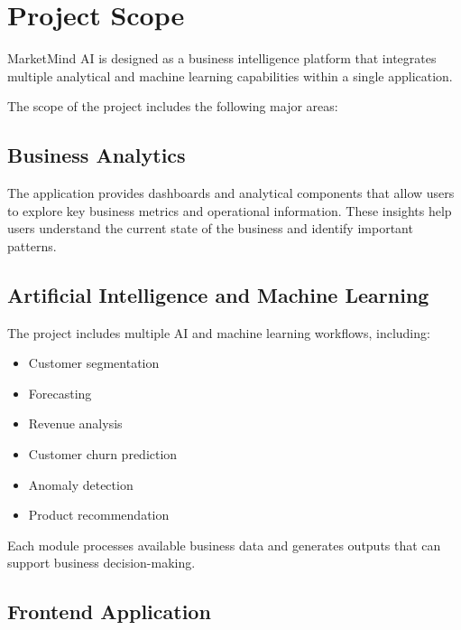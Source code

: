 \documentclass[12pt,a4paper]{report}
\begin{document}

\section{Project Scope}

MarketMind AI is designed as a business intelligence platform that
integrates multiple analytical and machine learning capabilities
within a single application.

The scope of the project includes the following major areas:

\subsection{Business Analytics}

The application provides dashboards and analytical components that
allow users to explore key business metrics and operational
information. These insights help users understand the current state
of the business and identify important patterns.

\subsection{Artificial Intelligence and Machine Learning}

The project includes multiple AI and machine learning workflows,
including:

\begin{itemize}

    \item Customer segmentation

    \item Forecasting

    \item Revenue analysis

    \item Customer churn prediction

    \item Anomaly detection

    \item Product recommendation

\end{itemize}

Each module processes available business data and generates outputs
that can support business decision-making.

\subsection{Frontend Application}
\end{document}
